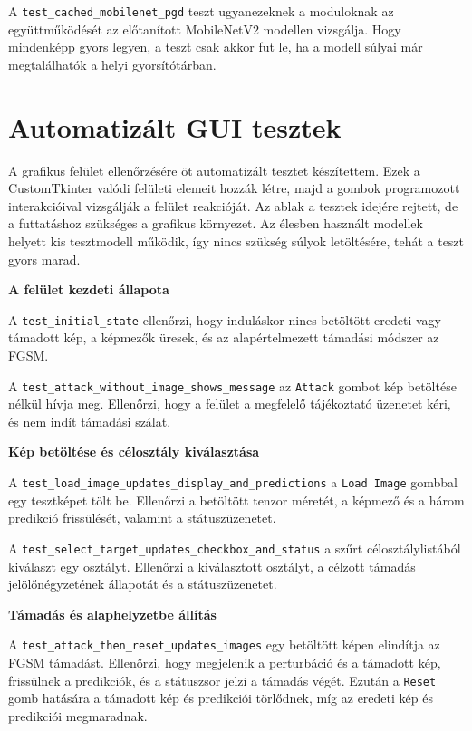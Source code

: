 A \texttt{test\_cached\_mobilenet\_pgd} teszt ugyanezeknek a moduloknak az együttműködését az előtanított MobileNetV2 modellen 
vizsgálja. 
Hogy mindenképp gyors legyen, a teszt csak akkor fut le, ha a modell súlyai már megtalálhatók a helyi gyorsítótárban. 

\section{Automatizált GUI tesztek}

A grafikus felület ellenőrzésére öt automatizált tesztet készítettem. 
Ezek a CustomTkinter valódi felületi elemeit hozzák létre, majd a gombok programozott interakcióival vizsgálják a felület 
reakcióját. 
Az ablak a tesztek idejére rejtett, de a futtatáshoz szükséges a grafikus környezet. 
Az élesben használt modellek helyett kis tesztmodell működik, így nincs szükség súlyok letöltésére, tehát a teszt gyors marad. 

\bigskip
\noindent\textbf{A felület kezdeti állapota}

\medskip
\noindent A \texttt{test\_initial\_state} ellenőrzi, hogy induláskor nincs betöltött eredeti vagy támadott kép, a képmezők 
üresek, és az alapértelmezett támadási módszer az FGSM. 

\medskip
\noindent A \texttt{test\_attack\_without\_image\_shows\_message} az \texttt{Attack} gombot kép betöltése nélkül hívja meg. 
Ellenőrzi, hogy a felület a megfelelő tájékoztató üzenetet kéri, és nem indít támadási szálat. 

\bigskip
\noindent\textbf{Kép betöltése és célosztály kiválasztása}

\medskip
\noindent A \texttt{test\_load\_image\_updates\_display\_and\_predictions} a \texttt{Load Image} gombbal egy tesztképet tölt be. 
Ellenőrzi a betöltött tenzor méretét, a képmező és a három predikció frissülését, valamint a státuszüzenetet. 

\medskip
\noindent A \texttt{test\_select\_target\_updates\_checkbox\_and\_status} a szűrt célosztálylistából kiválaszt egy osztályt. 
Ellenőrzi a kiválasztott osztályt, a célzott támadás jelölőnégyzetének állapotát és a státuszüzenetet. 

\bigskip
\noindent\textbf{Támadás és alaphelyzetbe állítás}

\medskip
\noindent A \texttt{test\_attack\_then\_reset\_updates\_images} egy betöltött képen elindítja az FGSM támadást. 
Ellenőrzi, hogy megjelenik a perturbáció és a támadott kép, frissülnek a predikciók, és a státuszsor jelzi a támadás végét. 
Ezután a \texttt{Reset} gomb hatására a támadott kép és predikciói törlődnek, míg az eredeti kép és predikciói megmaradnak. 


